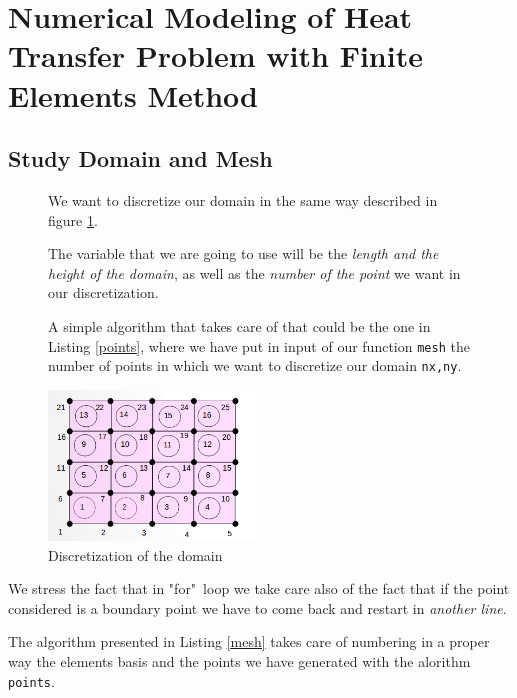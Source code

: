 \section{Numerical Modeling of Heat Transfer Problem with Finite Elements Method}
\subsection{Study Domain and Mesh}
\label{sec:4.1}
\begin{figure}[htbp]
	\begin{minipage}[c]{.5\linewidth}
		We want to discretize our domain in the same way described in figure \ref{figure:mesh}.
		
		The variable that we are going to use will be the \emph{length and the height of the domain}, as well as the \emph{number of the point} we want in our discretization. 
		
		A simple algorithm that takes care of that could be the one in Listing \ref{points}, where we have put in input of our function \texttt{mesh} the number of points in which we want to discretize our domain \texttt{nx,ny}.   
	\end{minipage} \hfill
	\begin{minipage}[c]{.5\linewidth}
		\centering
		\includegraphics[height=4cm]{Images/mesh.png}
		\caption{Discretization of the domain}
		\label{figure:mesh}
	\end{minipage}
\end{figure}





We stress the fact that in "for"~loop we take care also of the fact that if the point considered is a boundary point we have to come back and restart in \emph{another line}.

The algorithm presented in Listing \ref{mesh} takes care of numbering in a proper way the elements basis and the points we have generated with the alorithm \texttt{points}.


